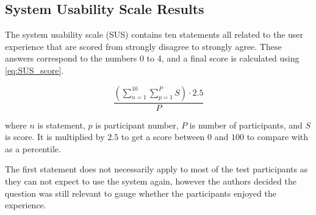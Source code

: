 \graphicspath{{fake_results/}}
\subsection{System Usability Scale Results}

The system usability scale (SUS) contains ten statements all related to the user experience that are scored from strongly disagree to strongly agree. These answers correspond to the numbers 0 to 4, and a final score is calculated using \autoref{eq:SUS_score}.

\begin{equation}
	\frac{(\sum\limits_{n=1}^{10} \sum\limits_{p=1}^{P} S) \cdot 2.5 }{P}
	\label{eq:SUS_score}
\end{equation}

where $ n $ is statement, $ p $ is participant number, $ P $ is number of participants, and $ S $ is score. It is multiplied by $2.5$ to get a score between $ 0 $ and $ 100 $ to compare with as a percentile. %

The first statement does not necessarily apply to most of the test participants as they can not expect to use the system again, however the authors decided the question was still relevant to gauge whether the participants enjoyed the experience. 


